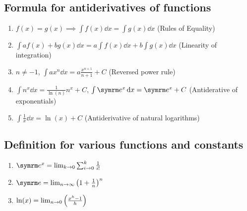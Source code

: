\subsection{Formula for antiderivatives of functions}

\begin{enumerate}
    \item $f(x) = g(x) \implies \int f(x)\dd{x} = \int g(x)\dd{x}$ (Rules of Equality)
    \item $\int af(x) + bg(x) \dd{x} = a\int f(x)\dd{x} + b\int g(x)\dd{x}$ (Linearity of integration)
    \item $n \neq -1$, $\int ax^n\dd{x} = a\frac{x^{n + 1}}{n + 1} + C$ (Reversed power rule)
    \item $\int n^x\dd{x} = \frac{1}{\ln(n)}n^x + C$, $\int \e^x\dd{x} = \e^x + C$ (Antiderative of exponentials)
    \item $\int \frac{1}{x}\dd{x} = \ln(x) + C$ (Antiderivative of natural logarithms)
\end{enumerate}

\subsection{Definition for various functions and constants}

\begin{enumerate}
    \item $\e^x = \lim_{k \appr 0}\sum_{i \appr 0}^{k}\frac{1}{i!}$
    \item $\e = \lim_{n \appr \infty}\left(1 + \frac{1}{n}\right)^n$
    \item $\ln(x) = \lim_{n \rightarrow 0}\left(\frac{x^h - 1}{h}\right)$
\end{enumerate}

\everymath{\textstyle}